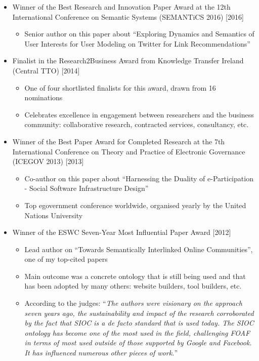 \documentclass[10pt,a4paper]{res} %
\begin{document}
\begin{resume}
\begin{itemize}
\begin{itemize}
\end{itemize}
\item Winner of the Best Research and Innovation Paper Award at the 12th International Conference on Semantic Systems (SEMANTiCS 2016) [2016]
\begin{itemize} \itemsep -2pt
\item Senior author on this paper about ``Exploring Dynamics and Semantics of User Interests for User Modeling on Twitter for Link Recommendations''
\end{itemize}
\item Finalist in the Research2Business Award from Knowledge Transfer Ireland (Central TTO) [2014]
\begin{itemize} \itemsep -2pt
\item One of four shortlisted finalists for this award, drawn from 16 nominations
\item Celebrates excellence in engagement between researchers and the business community: collaborative research, contracted services, consultancy, etc.
\end{itemize}
\item Winner of the Best Paper Award for Completed Research at the 7th International Conference on Theory and Practice of Electronic Governance (ICEGOV 2013) [2013]
\begin{itemize} \itemsep -2pt
\item Co-author on this paper about ``Harnessing the Duality of e-Participation - Social Software Infrastructure Design''
\item Top egovernment conference worldwide, organised yearly by the United Nations University
\end{itemize}
\item Winner of the ESWC Seven-Year Most Influential Paper Award [2012]
\begin{itemize} \itemsep -2pt
\item Lead author on ``Towards Semantically Interlinked Online Communities'', one of my top-cited papers
\item Main outcome was a concrete ontology that is still being used and that has been adopted by many others: website builders, tool builders, etc.
\item According to the judges: ``\textit{The authors were visionary on the approach seven years ago, the sustainability and impact of the research corroborated by the fact that SIOC is a de facto standard that is used today. The SIOC ontology has become one of the most used in the field, challenging FOAF in terms of most used outside of those supported by Google and Facebook. It has influenced numerous other pieces of work.}''

\end{itemize}
\end{itemize}
\end{resume}
\end{document}
